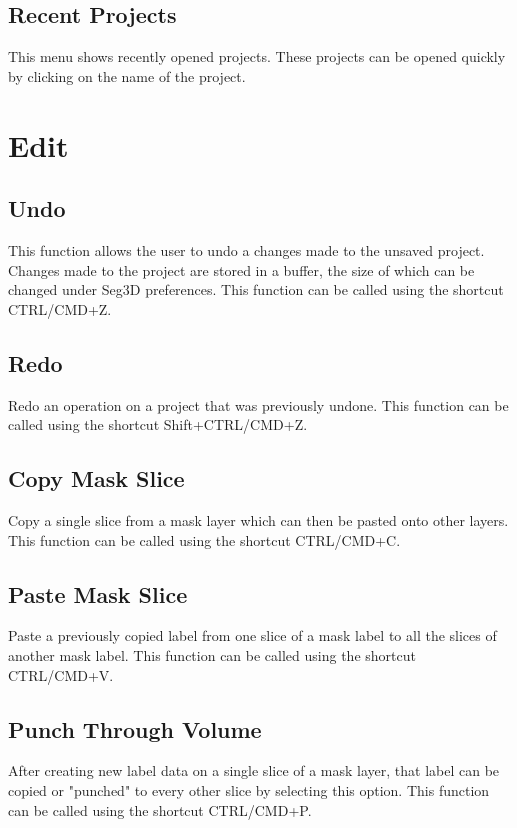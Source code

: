 \documentclass[fleqn,11pt,openany]{book}
\begin{document}
\subsection{Recent Projects}
This menu shows recently opened projects.  These projects can be opened quickly by clicking on the name of the project.

\section{Edit}

\subsection{Undo}
This function allows the user to undo a changes made to the unsaved project.  Changes made to the project are stored
in a buffer, the size of which can be changed under Seg3D preferences. This function can be called using the shortcut CTRL/CMD+Z.


\subsection{Redo}
Redo an operation on a project that was previously undone. This function can be called using the shortcut Shift+CTRL/CMD+Z.


\subsection{Copy Mask Slice}
\label{sec:copy}
Copy a single slice from a mask layer which can then be pasted onto other layers. This function can be called using the shortcut CTRL/CMD+C.


\subsection{Paste Mask Slice}
\label{sec:paste}
Paste a previously copied label from one slice of a mask label to all the slices of another mask label. This function can be called using the shortcut CTRL/CMD+V.


\subsection{Punch Through Volume}
\label{sec:punch}
After creating new label data on a single slice of a mask layer, that label can be copied or "punched" to every other slice by
selecting this option. This function can be called using the shortcut CTRL/CMD+P.
\end{document}
